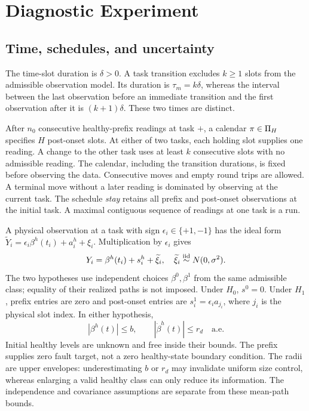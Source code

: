 \section{Diagnostic Experiment}
\subsection{Time, schedules, and uncertainty}
The time-slot duration is $\delta>0$. A task transition excludes $k\ge1$ slots from the admissible observation model. Its duration is $\tau_m=k\delta$, whereas the interval between the last observation before an immediate transition and the first observation after it is $(k+1)\delta$. These two times are distinct.

\begin{definition}\label{def:calendar}
After $n_0$ consecutive healthy-prefix readings at task $+$, a calendar $\pi\in\Pi_H$ specifies $H$ post-onset slots. At either of two tasks, each holding slot supplies one reading. A change to the other task uses at least $k$ consecutive slots with no admissible reading. The calendar, including the transition durations, is fixed before observing the data. Consecutive moves and empty round trips are allowed. A terminal move without a later reading is dominated by observing at the current task. The schedule \emph{stay} retains all prefix and post-onset observations at the initial task. A maximal contiguous sequence of readings at one task is a run.
\end{definition}

A physical observation at a task with sign $\epsilon_i\in\{+1,-1\}$ has the ideal form $\widetilde Y_i=\epsilon_i\beta^h(t_i)+a_i^h+\xi_i$. Multiplication by $\epsilon_i$ gives
\begin{equation}
 Y_i=\beta^h(t_i)+s_i^h+\widetilde\xi_i,
 \quad\widetilde\xi_i\stackrel{\rm iid}{\sim}N(0,\sigma^2).
 \label{eq:obs}
\end{equation}
The two hypotheses use independent choices $\beta^0,\beta^1$ from the same admissible class; equality of their realized paths is not imposed. Under $H_0$, $s^0=0$. Under $H_1$, prefix entries are zero and post-onset entries are $s_i^1=\epsilon_i a_{j_i}$, where $j_i$ is the physical slot index. In either hypothesis,
\begin{equation}
 |\beta^h(t)|\le b,\qquad |\dot\beta^h(t)|\le r_d
 \quad\text{a.e.}\label{eq:health}
\end{equation}
Initial healthy levels are unknown and free inside their bounds. The prefix supplies zero fault target, not a zero healthy-state boundary condition. The radii are upper envelopes: underestimating $b$ or $r_d$ may invalidate uniform size control, whereas enlarging a valid healthy class can only reduce its information. The independence and covariance assumptions are separate from these mean-path bounds.

